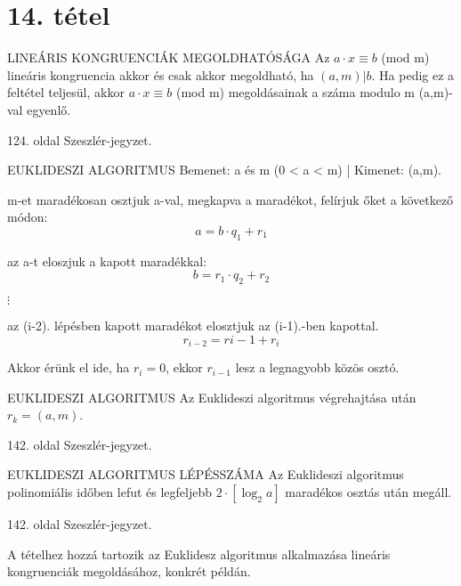 \section{14. tétel}

\begin{tetel}{LINEÁRIS KONGRUENCIÁK MEGOLDHATÓSÁGA}
Az $a \cdot x \equiv b$ (mod m) lineáris kongruencia akkor és csak akkor megoldható, ha $(a,m)|b$. Ha pedig ez a feltétel teljesül, akkor  $a \cdot x \equiv b$ (mod m) megoldásainak a száma modulo m (a,m)-val egyenlő.
\end{tetel}

\begin{bizonyitas}{}
124. oldal Szeszlér-jegyzet.
\end{bizonyitas}

\begin{tetel}{EUKLIDESZI ALGORITMUS}
Bemenet: a és m (0 < a < m) | Kimenet: (a,m).
\begin{description}
\item[1. lépés:]m-et maradékosan osztjuk a-val, megkapva a maradékot, felírjuk őket a következő módon:
$$a = b\cdot q_1 + r_1$$
\item[2. lépés:]az a-t eloszjuk a kapott maradékkal:
$$b = r_1\cdot q_2 + r_2$$
\item $\vdots$
\item[i. lépés:] az (i-2). lépésben kapott maradékot elosztjuk az (i-1).-ben kapottal.
$$r_{i-2} = r{i-1} + r_i$$
\item[Utolsó lépés] Akkor érünk el ide, ha $r_i = 0$, ekkor $r_{i-1}$ lesz a legnagyobb közös osztó.
\end{description}
\end{tetel}

\begin{tetel}{EUKLIDESZI ALGORITMUS}
Az Euklideszi algoritmus végrehajtása után $r_k = (a,m)$.
\end{tetel}

\begin{bizonyitas}{}
142. oldal Szeszlér-jegyzet.
\end{bizonyitas}

\begin{tetel}{EUKLIDESZI ALGORITMUS LÉPÉSSZÁMA}
Az Euklideszi algoritmus polinomiális időben lefut és legfeljebb $2 \cdot [\log_2a]$ maradékos osztás után megáll.
\end{tetel}

\begin{bizonyitas}{}
142. oldal Szeszlér-jegyzet.
\end{bizonyitas}

A tételhez hozzá tartozik az Euklidesz algoritmus alkalmazása lineáris kongruenciák megoldásához, konkrét példán.
